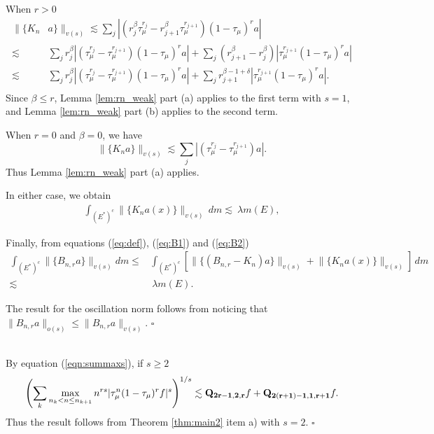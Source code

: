 \documentclass[11pt]{amsart}
\theoremstyle{definition}
\theoremstyle{remark}
\begin{document}
When $r>0$
\begin{align*} 
\lVert \{K_n  &   a\} \rVert_{v(s)} \lesssim    \sum_j  |  (r_j^{\beta} \tau_{\mu}^{r_j}-  r_{j+1}^{\beta} \tau_{\mu}^{r_{j+1}}) (1-\tau_{\mu})^r a| \\
 \lesssim  & \sum_j    r_j^{\beta} |(\tau_{\mu}^{r_j}-  \tau_{\mu}^{r_{j+1}}) (1-\tau_{\mu})^r a|
 + \sum_j   ( r_{j+1}^{\beta} -r_j^{\beta}) |\tau_{\mu}^{r_{j+1}} (1-\tau_{\mu})^r a|  \\
  \lesssim  & \sum_j    r_j^{\beta} |(\tau_{\mu}^{r_j}-  \tau_{\mu}^{r_{j+1}}) (1-\tau_{\mu})^r a|
 + \sum_j     r_{j+1}^{\beta-1+\delta}  |\tau_{\mu}^{r_{j+1}} (1-\tau_{\mu})^r a|.  \\
 \end{align*}
Since $\beta \le r$,  Lemma \ref{lem:rn_weak} part (a) applies to the first term with $s=1$, and 
Lemma \ref{lem:rn_weak} part (b) applies to the second term.

When $r=0$ and $\beta=0$, we have
\[ \lVert \{K_n    a\} \rVert_{v(s)} \lesssim    \sum_j  |  ( \tau_{\mu}^{r_j}-  \tau_{\mu}^{r_{j+1}}) a|. \]
Thus Lemma \ref{lem:rn_weak} part (a) applies. 

In either case, 
we obtain
\begin{align} \label{eq:B2} \int_{(E^*)^c}  \lVert \{K_n    a(x)\} \rVert_{v(s)} \, dm 
\lesssim  \ \lambda  m(E),
\end{align}

Finally, from equations (\ref{eq:def}), (\ref{eq:B1}) and (\ref{eq:B2})
\begin{align*}
\int_{(E^*)^c} \lVert \{ B_{n,r} a\} \rVert_{v(s)}  dm 
\le &
\int_{(E^*)^c}  \left[ \lVert \{ (B_{n,r} -K_n)  a\} \rVert_{v(s)}
  + 
\lVert \{K_n   a(x)\} \rVert_{v(s)}\right] \, dm\\
 \lesssim & \  \lambda m(E).
  \end{align*}
  
  
The result for the oscillation norm follows from noticing that $ \lVert B_{n,r}a \rVert_{o(s)}\le   \lVert B_{n,r}a \rVert_{v(s)}$.
\hfill$\square$


\\
By equation (\ref{eqn:summaxs}), if $s\ge 2$
\[\left(\sum_k \max_{n_k<n\le n_{k+1}} n^{r s} |\tau_{\mu}^n(1-\tau_{\mu})^r f |^s \right)^{1/s} \lesssim
 {\bf Q_{2r-1,2,r}}f + {\bf Q_{2(r+1)-1,1,r+1}}f.\]
 Thus the result follows from Theorem \ref{thm:main2} item a) with $s=2$.
\hfill$\square$
\end{document}
